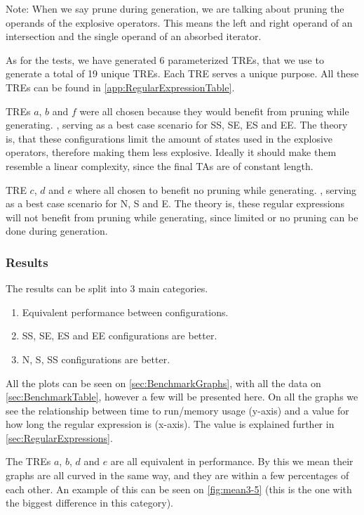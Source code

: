 Note: When we say prune during generation, we are talking about pruning the operands of the explosive operators.
This means the left and right operand of an intersection and the single operand of an absorbed iterator.

As for the tests, we have generated 6 parameterized TREs, that we use to generate a total of 19 unique TREs.
Each TRE serves a unique purpose.
All these TREs can be found in \cref{app:RegularExpressionTable}.

TREs $a$, $b$ and $f$ were all chosen because they would benefit from pruning while generating.
, serving as a best case scenario for SS, SE, ES and EE.
The theory is, that these configurations limit the amount of states used in the explosive operators, therefore making them less explosive.
Ideally it should make them resemble a linear complexity, since the final TAs are of constant length.

TRE $c$, $d$ and $e$ where all chosen to benefit no pruning while generating.
, serving as a best case scenario for N, S and E.
The theory is, these regular expressions will not benefit from pruning while generating, since limited or no pruning can be done during generation.

\subsubsection{Results}
The results can be split into 3 main categories.

\begin{enumerate}
    \item Equivalent performance between configurations.
    \item SS, SE, ES and EE configurations are better.
    \item N, S, SS configurations are better.
\end{enumerate}

All the plots can be seen on \cref{sec:BenchmarkGraphs}, with all the data on \cref{sec:BenchmarkTable}, however a few will be presented here.
On all the graphs we see the relationship between time to run/memory usage (y-axis) and a value for how long the regular expression is (x-axis). The value is explained further in \cref{sec:RegularExpressions}.

The TREs $a$, $b$, $d$ and $e$ are all equivalent in performance.
By this we mean their graphs are all curved in the same way, and they are within a few percentages of each other.
An example of this can be seen on \cref{fig:mean3-5} (this is the one with the biggest difference in this category).

